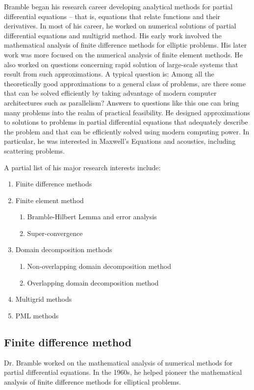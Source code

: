 \documentclass[CJK,11pt]{amsart}
\theoremstyle{definition}
\begin{document}
\begin{CJK*}{UTF8}{gbsn}
Bramble began his research career developing analytical methods for
partial differential equations -- that is, equations that relate
functions and their derivatives.  In most of his career, he worked on
numerical solutions of partial differential equations and multigrid
method. His early work involved the mathematical analysis of finite
difference methods for elliptic problems. His later work was more
focused on the numerical analysis of finite element methods.  He also
worked on questions concerning rapid solution of large-scale systems
that result from such approximations. A typical question is: Among all
the theoretically good approximations to a general class of problems,
are there some that can be solved efficiently by taking advantage of
modern computer architectures such as parallelism? Answers to
questions like this one can bring many problems into the realm of
practical feasibility. He designed approximations to solutions to
problems in partial differential equations that adequately describe
the problem and that can be efficiently solved using modern computing
power. In particular, he was interested in Maxwell's Equations and acoustics,
including scattering problems.

A partial list of his major research interests include:
\begin{enumerate}
\item Finite difference methods
\item Finite element method
\begin{enumerate}
\item Bramble-Hilbert Lemma and error analysis
\item Super-convergence
\end{enumerate}
\item Domain decomposition methods 
\begin{enumerate}
\item Non-overlapping domain decomposition method
\item Overlapping domain decomposition method
  \end{enumerate}
\item Multigrid methods 
\item {PML methods}
\end{enumerate}
\subsection{Finite difference method}
Dr. Bramble worked on the mathematical analysis of numerical methods
for partial differential equations. In the 1960s, he helped pioneer
the mathematical analysis of finite difference methods for elliptical
problems.


\end{CJK*}
\end{document}
